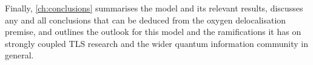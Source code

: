 Finally, \cref{ch:conclusions} summarises the model and its relevant results, discusses any and all conclusions that can be deduced from the oxygen delocalisation premise, and outlines the outlook for this model and the ramifications it has on strongly coupled TLS research and the wider quantum information community in general.



